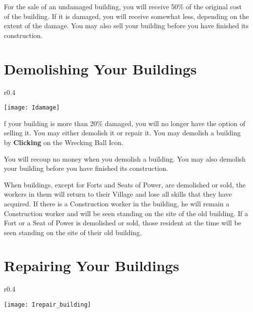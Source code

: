 For the sale of an undamaged building, you will receive 50\% of the original cost of the building. If it is damaged, you will receive somewhat less, depending on the extent of the damage. You may also sell your building before you have finished its construction.

\section{\textsf{Demolishing Your Buildings}}

    
\begin{wrapfigure}{r}{0.4\textwidth}
    \vspace{-20pt}
    \begin{center}
        \texttt{[image: Idamage]}
    \end{center}
    \vspace{-20pt}
\end{wrapfigure}

f your building is more than 20\% damaged, you will no longer have the option of selling it. You may either demolish it or repair it. You may demolish a building by \textbf{Clicking} on the Wrecking Ball Icon.

You will recoup no money when you demolish a building. You may also demolish your building before you have finished its construction.


When buildings, except for Forts and Seats of Power, are demolished or sold, the workers in them will return to their Village and lose all skills that they have acquired. If there is a Construction worker in the building, he will remain a Construction worker and will be seen standing on the site of the old building. If a Fort or a Seat of Power is demolished or sold, those resident at the time will be seen standing on the site of their old building.

\section{\textsf{Repairing Your Buildings}}

    
\begin{wrapfigure}{r}{0.4\textwidth}
    \vspace{-20pt}
    \begin{center}
        \texttt{[image: Irepair\_building]}
    \end{center}
    \vspace{-10pt} %
\end{wrapfigure}

